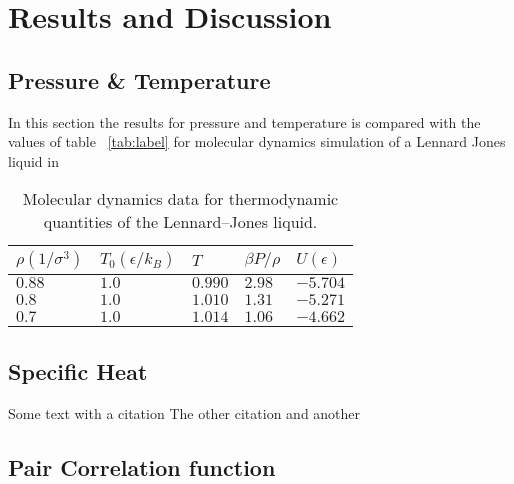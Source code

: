 \documentclass[
10pt, %
a4paper, %
oneside, %
headinclude,footinclude, %
BCOR5mm, %
]{scrartcl}
\begin{document}
\newpage

\section{Results and Discussion}

\subsection{Pressure \& Temperature}
In this section the results for pressure and temperature is compared with the values of table ~\vref{tab:label} for molecular dynamics simulation of a Lennard Jones liquid in \cite{Thijssen:2013cp}

\begin{table}[hbt]
\caption{Molecular dynamics data for thermodynamic quantities of the Lennard–Jones liquid.}
\centering
\begin{tabular}{lllll}
\toprule
\toprule
$\rho(1/\sigma^3)$ & $T_0(\epsilon/k_B)$ & $T$ & $\beta P/\rho$ & $U(\epsilon)$ \\
\midrule
$0.88$ & $1.0$ & $0.990$ & $2.98$ & $-5.704$ \\
$0.8$ & $1.0$ & $1.010$ & $1.31$ & $-5.271$ \\
$0.7$ & $1.0$ & $1.014$ & $1.06$ & $-4.662$ \\
\bottomrule
\bottomrule
\end{tabular}
\label{tab:label}
\end{table}



\subsection{Specific Heat}




Some text with a citation \cite{Verlet:1967md}
The other citation \cite{Glosser:2015iccp} and another\cite{Thijssen:2013cp}


\subsection{Pair Correlation function}
\end{document}
